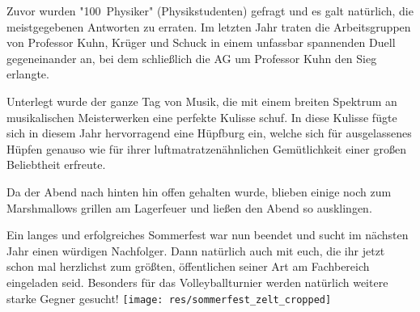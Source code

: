\begin{multicols}{2}
Zuvor wurden "100~Physiker" (Physikstudenten) gefragt und es galt natürlich, die meistgegebenen Antworten zu erraten.
Im letzten Jahr traten die Arbeitsgruppen von Professor Kuhn, Krüger und Schuck in einem unfassbar spannenden Duell gegeneinander an, bei dem schließlich die AG um Professor Kuhn den Sieg erlangte.

Unterlegt wurde der ganze Tag von Musik, die mit einem breiten Spektrum an musikalischen Meisterwerken eine perfekte Kulisse schuf. In diese Kulisse fügte sich in diesem Jahr hervorragend eine Hüpfburg ein, welche sich für ausgelassenes Hüpfen genauso wie für ihrer luftmatratzenähnlichen Gemütlichkeit einer großen Beliebtheit erfreute.

Da der Abend nach hinten hin offen gehalten wurde, blieben einige noch zum Marshmallows grillen am Lagerfeuer und ließen
den Abend so ausklingen.

Ein langes und erfolgreiches Sommerfest war nun beendet und sucht im nächsten Jahr einen würdigen Nachfolger.
Dann natürlich auch mit euch, die ihr jetzt schon mal herzlichst zum größten, öffentlichen seiner Art am Fachbereich eingeladen seid.
Besonders für das Volleyballturnier werden natürlich weitere starke Gegner gesucht!
\texttt{[image: res/sommerfest\_zelt\_cropped]}
\end{multicols}

